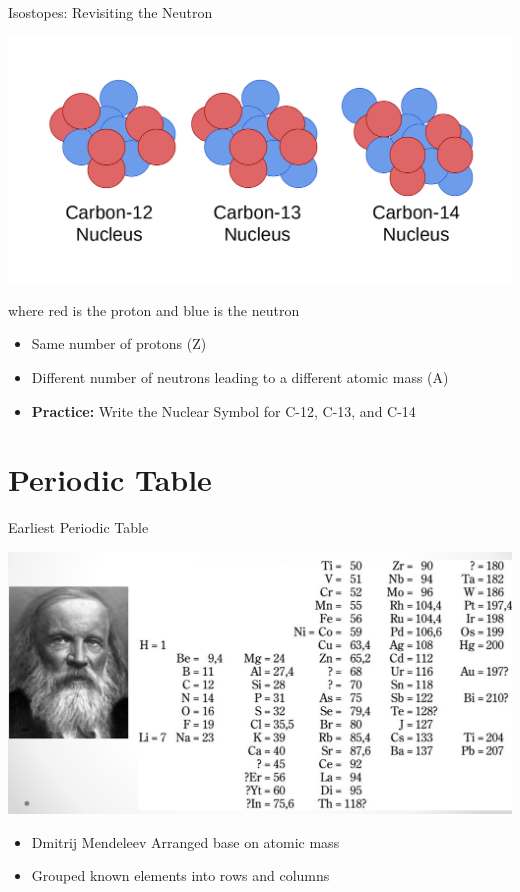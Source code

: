 \documentclass[11pt]{beamer}
\begin{document}
\begin{frame}{Isostopes: Revisiting the Neutron}
  \begin{center}
    \includegraphics[scale=0.2]{carbon_isotopes}
  \end{center}
  where red is the proton and blue is the neutron
  
  \begin{itemize}
  \item Same number of protons (Z)
  \item Different number of neutrons leading to
    a different atomic mass (A)
  \item \textbf{Practice:} Write the Nuclear Symbol for
    C-12, C-13, and C-14
  \end{itemize}
\end{frame}

\section{Periodic Table}

\begin{frame}{Earliest Periodic Table}
  \begin{center}
    \includegraphics[scale=0.13]{mendeleev_table}
  \end{center}
  
  \begin{itemize}
  \item Dmitrij Mendeleev Arranged base on atomic mass
  \item Grouped known elements into rows and columns
  \end{itemize}
\end{frame}
\end{document}

